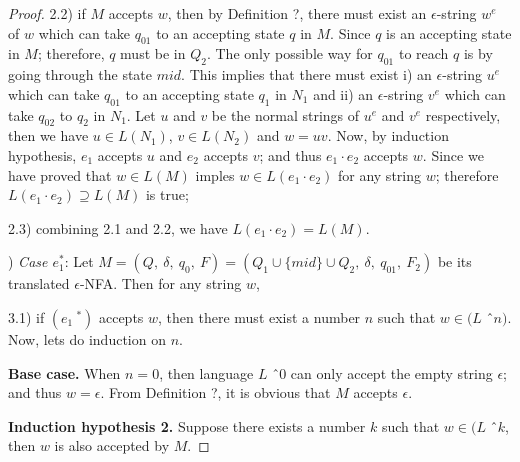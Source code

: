 \begin{proof}
\par 2.2) if \(M\) accepts \(w\), then by Definition ?, there must
exist an \(\epsilon\)-string \(w^e\) of \(w\) which can take
\(q_{01}\) to an accepting state \(q\) in \(M\). Since \(q\) is an
accepting state in \(M\); therefore, \(q\) must be in \(Q_2\). The only possible way for
\(q_{01}\) to reach \(q\) is by going through the state \(mid\). This
implies that there must exist i) an \(\epsilon\)-string \(u^e\) which can take
\(q_{01}\) to an accepting state \(q_1\) in \(N_1\) and ii) an
\(\epsilon\)-string \(v^e\) which can take \(q_{02}\) to \(q_2\) in
\(N_1\). Let \(u\) and \(v\) be the normal strings of \(u^e\) and
\(v^e\) respectively, then we have \(u \in L(N_1)\), \(v \in L(N_2)\) and \(w = uv\). Now, by induction
hypothesis, \(e_1\) accepts \(u\) and \(e_2\) accepts \(v\); and thus
\(e_1 \cdot e_2\) accepts \(w\). Since we have proved that \(w \in
L(M)\) imples \(w \in L(e_1 \cdot e_2)\) for any string \(w\); therefore \(L(e_1 \cdot
e_2) \supseteq L(M)\) is true; 

\par 2.3) combining 2.1 and 2.2, we have \(L(e_1 \cdot e_2) = L(M)\). 

\par {}) \textit{Case \(e_1^*\)}: Let \(M = (Q,\ \delta,\ q_0,\
F) = (Q_1 \cup \{mid\} \cup Q_2,\ \delta,\ q_{01},\ F_2)\) be its
translated \(\epsilon\)-NFA. Then for any string \(w\), 

\par 3.1) if \((e_1\ ^*)\) accepts \(w\), then there must exist a number
\(n\) such that \(w \in (L\) \^\ \(n)\). Now, lets do induction on \(n\). 

\par \quad \textbf{Base case.} \quad When \(n = 0\), then language \(L\) \^\
\(0\) can only accept the empty string \(\epsilon\); and thus \(w =
\epsilon\). From Definition ?, it is obvious that \(M\) accepts
\(\epsilon\). 

\par \quad \textbf{Induction hypothesis 2.} \quad Suppose there exists a number \(k\) such that \(w
\in (L\) \^\ \(k\), then \(w\) is also accepted by \(M\). 


\end{proof}
